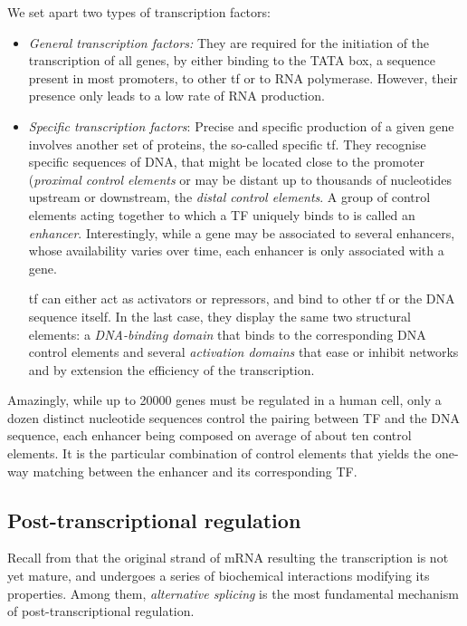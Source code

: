 We set apart two types of transcription factors:
\begin{itemize}
    \item \emph{General transcription factors:} They are required for the initiation of the transcription of all genes, by either binding to the TATA box, a sequence present in most promoters, to other \acrshort{tf} or to RNA polymerase. However, their presence only leads to a low rate of RNA production. 
    
\item \emph{Specific transcription factors}: Precise and specific production of a given gene involves another set of proteins, the so-called specific \acrshort{tf}. They recognise specific sequences of DNA, that might be located close to the promoter (\emph{proximal control elements} or may be distant up to thousands of nucleotides upstream or downstream, the \emph{distal control elements}. A group of control elements acting together to which a TF uniquely binds to is called an \emph{enhancer}. Interestingly, while a gene may be associated to several enhancers, whose availability varies over time, each enhancer is only associated with a gene. 

\acrshort{tf} can either act as activators or repressors, and bind to other \acrshort{tf} or the DNA sequence itself. In the last case, they display the same two structural elements: a \emph{DNA-binding domain} that binds to the corresponding DNA control elements and several \emph{activation domains} that ease or inhibit  networks and by extension the efficiency of the transcription. 
\end{itemize}

Amazingly, while up to \num{20000} genes must be regulated in a human cell, only a dozen distinct nucleotide sequences control the pairing between TF and the DNA sequence, each enhancer being composed
on average of about ten control elements. It is the particular combination of control elements that yields the one-way matching between the enhancer and its corresponding TF. 


\subsection{Post-transcriptional regulation}
\label{subsec:alternative-splicing}

Recall from  that the original strand of mRNA resulting the transcription is not yet mature, and undergoes a series of biochemical interactions modifying its properties. Among them, \emph{alternative splicing} is the most fundamental mechanism of post-transcriptional regulation. 

